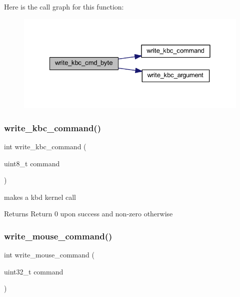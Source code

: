 Here is the call graph for this function\+:
\nopagebreak
\begin{figure}[H]
\begin{center}
\leavevmode
\includegraphics[width=328pt]{group__mouse_gae71de5cc3d84045784f84fb32e0c4bd3_cgraph}
\end{center}
\end{figure}
\mbox{\label{group__mouse_gac193b39c229dcec39b0d82bb9f242574}} 
\subsubsection{\texorpdfstring{write\_kbc\_command()}{write\_kbc\_command()}}
{\footnotesize\ttfamily int write\+\_\+kbc\+\_\+command (\begin{DoxyParamCaption}\item[{uint8\+\_\+t}]{command }\end{DoxyParamCaption})}



makes a kbd kernel call 

\begin{DoxyReturn}{Returns}
Return 0 upon success and non-\/zero otherwise 
\end{DoxyReturn}
\mbox{\label{group__mouse_ga26d0989b9acaa8dea02b2f0639916c0e}} 
\subsubsection{\texorpdfstring{write\_mouse\_command()}{write\_mouse\_command()}}
{\footnotesize\ttfamily int write\+\_\+mouse\+\_\+command (\begin{DoxyParamCaption}\item[{uint32\+\_\+t}]{command }\end{DoxyParamCaption})}



